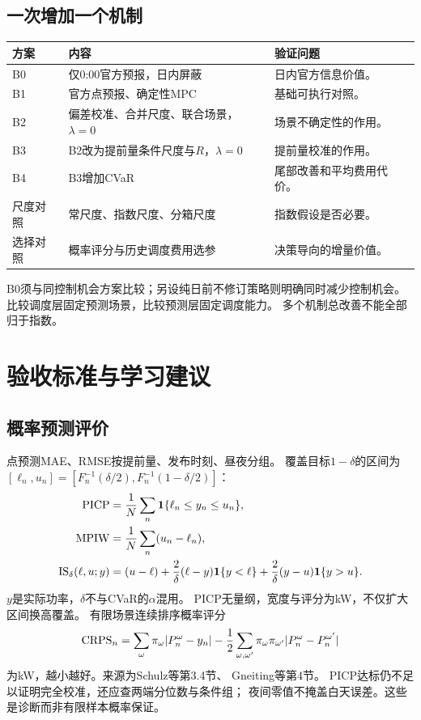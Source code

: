 \documentclass[UTF8,11pt]{ctexart}
\begin{document}
\subsection{一次增加一个机制}
\begin{longtable}{p{1.9cm}p{6.0cm}p{5.9cm}}
\toprule 方案 & 内容 & 验证问题\\ \midrule
\endhead
B0 & 仅0:00官方预报，日内屏蔽 & 日内官方信息价值。\\
B1 & 官方点预报、确定性MPC & 基础可执行对照。\\
B2 & 偏差校准、合并尺度、联合场景，$\lambda=0$ & 场景不确定性的作用。\\
B3 & B2改为提前量条件尺度与$R$，$\lambda=0$ & 提前量校准的作用。\\
B4 & B3增加CVaR & 尾部改善和平均费用代价。\\
尺度对照 & 常尺度、指数尺度、分箱尺度 & 指数假设是否必要。\\
选择对照 & 概率评分与历史调度费用选参 & 决策导向的增量价值。\\
\bottomrule
\end{longtable}
B0须与同控制机会方案比较；另设纯日前不修订策略则明确同时减少控制机会。
比较调度层固定预测场景，比较预测层固定调度能力。
多个机制总改善不能全部归于指数。

\section{验收标准与学习建议}
\subsection{概率预测评价}
点预测MAE、RMSE按提前量、发布时刻、昼夜分组。
覆盖目标$1-\delta$的区间为
$[\ell_n,u_n]=[F_n^{-1}(\delta/2),F_n^{-1}(1-\delta/2)]$：
\begin{align}
 {\rm PICP}&=\frac1N\sum_n\mathbf1\{\ell_n\leq y_n\leq u_n\},\\
 {\rm MPIW}&=\frac1N\sum_n(u_n-\ell_n),\\
 {\rm IS}_\delta(\ell,u;y)
 &=(u-\ell)+\frac2\delta(\ell-y)\mathbf1\{y<\ell\}
          +\frac2\delta(y-u)\mathbf1\{y>u\}.
\end{align}
$y$是实际功率，$\delta$不与CVaR的$\alpha$混用。
PICP无量纲，宽度与评分为kW，不仅扩大区间换高覆盖。
有限场景连续排序概率评分
\begin{equation}
 {\rm CRPS}_n=\sum_\omega\pi_\omega|P_n^\omega-y_n|
 -\frac12\sum_{\omega,\omega'}\pi_\omega\pi_{\omega'}
 |P_n^\omega-P_n^{\omega'}|
\end{equation}
为kW，越小越好。来源为Schulz等第3.4节\cite{schulz2021}、
Gneiting等第4节\cite{gneiting2023}。
PICP达标仍不足以证明完全校准，还应查两端分位数与条件组；
夜间零值不掩盖白天误差。这些是诊断而非有限样本概率保证。
\end{document}
